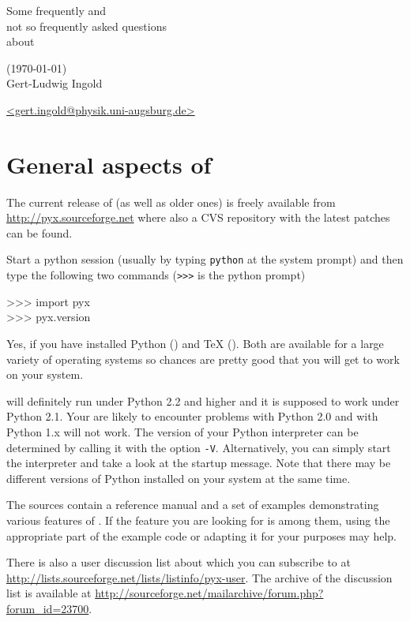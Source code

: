 \documentclass[11pt,DIV14]{scrartcl}
\begin{document}
\begin{center}
\LARGE\sffamily Some frequently and\\ 
not so frequently asked questions\\ 
about \PyX\\
\par
{\small\sffamily (\today)}\\[1truecm]
\large
Gert-Ludwig Ingold \par
\href{mailto:gert.ingold@physik.uni-augsburg.de}{\url{<gert.ingold@physik.uni-augsburg.de>}}
\end{center}
\toc
\newpage

\section{General aspects of \PyX}
{}
{The current release of \PyX{} (as well as older ones) is freely available 
from \url{http://pyx.sourceforge.net} where also a CVS repository with the 
latest patches can be found.
}

{}
{Start a python session (usually by typing \texttt{python} at the system
prompt) and then type the following two commands (\texttt{>>>} is the python 
prompt)
\begin{progcode}
>>> import pyx\\
>>> pyx.\us\us{}version\us\us
\end{progcode}
}

{}
{Yes, if you have installed Python ()
and \TeX{} (). Both are available for
a large variety of operating systems so chances are pretty good that you will 
get \PyX{} to work on your system.
}

{}
{\PyX{} will definitely run under Python 2.2 and higher and it is supposed
to work under Python 2.1. Your are likely to encounter problems with Python 2.0
and with Python 1.x \PyX{} will not work. The version of your Python interpreter
can be determined by calling it with the option \texttt{-V}. Alternatively,
you can simply start the interpreter and take a look at the startup message.
Note that there may be different versions of Python installed on your system
at the same time.
}

{}
{The \PyX{} sources contain a reference manual and a set of examples 
demonstrating various features of \PyX. If the feature you are looking for is
among them, using the appropriate part of the example code or adapting it for
your purposes may help.

There is also a user discussion list about \PyX{} which you can subscribe to
at \url{http://lists.sourceforge.net/lists/listinfo/pyx-user}. The archive of
the discussion list is available at \url{http://sourceforge.net/mailarchive/forum.php?forum_id=23700}.
}
\end{document}
